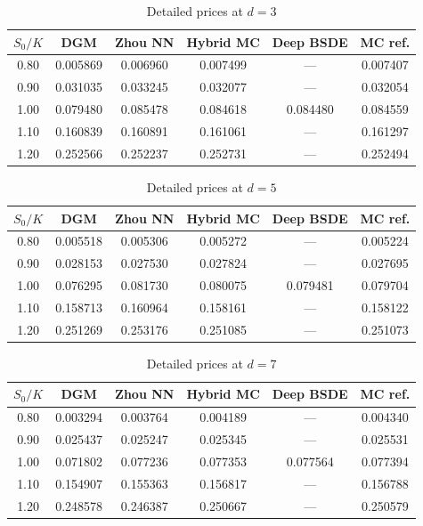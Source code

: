 \documentclass[12pt, a4paper]{article}
\begin{document}
\begin{table}[htpb]
    \centering
    \caption{Detailed prices at $d=3$}
    \label{tab:prices_d3}
    \begin{tabular}{|c|c|c|c|c|c|}
        \hline
        $S_0/K$ & DGM & Zhou NN & Hybrid MC & Deep BSDE & MC ref. \\
        \hline
        0.80 & 0.005869 & 0.006960 & 0.007499 & --- & 0.007407 \\
        0.90 & 0.031035 & 0.033245 & 0.032077 & --- & 0.032054 \\
        1.00 & 0.079480 & 0.085478 & 0.084618 & 0.084480 & 0.084559 \\
        1.10 & 0.160839 & 0.160891 & 0.161061 & --- & 0.161297 \\
        1.20 & 0.252566 & 0.252237 & 0.252731 & --- & 0.252494 \\
        \hline
    \end{tabular}
\end{table}

\begin{table}[htpb]
    \centering
    \caption{Detailed prices at $d=5$}
    \label{tab:prices_d5}
    \begin{tabular}{|c|c|c|c|c|c|}
        \hline
        $S_0/K$ & DGM & Zhou NN & Hybrid MC & Deep BSDE & MC ref. \\
        \hline
        0.80 & 0.005518 & 0.005306 & 0.005272 & --- & 0.005224 \\
        0.90 & 0.028153 & 0.027530 & 0.027824 & --- & 0.027695 \\
        1.00 & 0.076295 & 0.081730 & 0.080075 & 0.079481 & 0.079704 \\
        1.10 & 0.158713 & 0.160964 & 0.158161 & --- & 0.158122 \\
        1.20 & 0.251269 & 0.253176 & 0.251085 & --- & 0.251073 \\
        \hline
    \end{tabular}
\end{table}

\begin{table}[htpb]
    \centering
    \caption{Detailed prices at $d=7$}
    \label{tab:prices_d7}
    \begin{tabular}{|c|c|c|c|c|c|}
        \hline
        $S_0/K$ & DGM & Zhou NN & Hybrid MC & Deep BSDE & MC ref. \\
        \hline
        0.80 & 0.003294 & 0.003764 & 0.004189 & --- & 0.004340 \\
        0.90 & 0.025437 & 0.025247 & 0.025345 & --- & 0.025531 \\
        1.00 & 0.071802 & 0.077236 & 0.077353 & 0.077564 & 0.077394 \\
        1.10 & 0.154907 & 0.155363 & 0.156817 & --- & 0.156788 \\
        1.20 & 0.248578 & 0.246387 & 0.250667 & --- & 0.250579 \\
        \hline
    \end{tabular}
\end{table}
\end{document}
